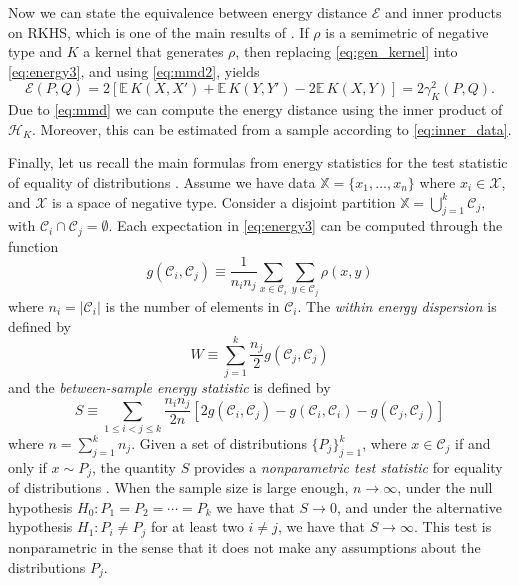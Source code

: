 \documentclass[aps,preprint,nofootinbib,floatfix]{revtex4-1}
\newcommand\Energy{\mathcal{E}}
\newcommand\E{\mathbb{E}}
\newcommand\kk{K}
\newcommand\Hk{{\mathcal{H}}_{\kk}}
\newcommand\C{{\mathcal{C}}}
\begin{document}
Now we can state the equivalence between energy distance $\Energy$ and
inner products on RKHS, which is one of the main results of
\cite{Sejdinovic2013}. If $\rho$ is a semimetric
of negative type and $\kk$ a kernel that generates $\rho$, then
replacing \eqref{eq:gen_kernel} into
\eqref{eq:energy3}, and using \eqref{eq:mmd2}, yields
\begin{equation} \label{eq:Erho}
\Energy(P, Q) = 
2 \left[ \E \, \kk(X, X') + \E \, \kk(Y, Y') - 2\E \, \kk(X, Y)\right] 
= 2 \gamma_\kk^2(P,Q) .
\end{equation}
Due to \eqref{eq:mmd} we can compute the energy distance using the inner 
product of $\Hk$. Moreover, this can be estimated from a sample
according to \eqref{eq:inner_data}.

Finally, let us recall the main formulas from energy statistics
for the test statistic of equality of distributions \cite{Szkely2013}. 
Assume we have data $\mathbb{X} = \{ x_1,\dotsc, x_n \}$ where
$x_i \in \mathcal{X}$, and $\mathcal{X}$ is a space of negative type.
Consider a disjoint partition $\mathbb{X} = \bigcup_{j=1}^k \C_j$, with
$\C_i \cap \C_j = \emptyset$.
Each expectation in 
\eqref{eq:energy3}
can be computed 
through the function
\begin{equation}
\label{eq:g_def}
g (\C_i, \C_j) \equiv 
\dfrac{1}{n_i n_j}
\sum_{x \in \C_i} 
\sum_{y \in \C_j} \rho(x, y)
\end{equation}
where $n_i = |\C_i|$ is the number of elements in 
$\C_i$. 
The \emph{within energy dispersion} is defined by
\begin{equation}
\label{eq:within}
W \equiv
\sum_{j=1}^{k} \dfrac{n_j}{2} g(\C_j, \C_j)
\end{equation}
and the \emph{between-sample energy statistic} is defined by
\begin{equation}
\label{eq:between}
S \equiv
\sum_{1 \le  i < j \le k } \dfrac{n_i n_{j}}{2 n} \left[
2 g(\C_i, \C_j) - 
g(\C_i, \C_i) - 
g(\C_j, \C_j)
\right]
\end{equation}
where $n = \sum_{j=1}^k n_j$.
Given a set of distributions
$\{ P_j\}_{j=1}^k$, where $x \in \C_j$ if and only if $x \sim P_j$, 
the quantity $S$ provides
a \emph{nonparametric test statistic} for equality of distributions
\cite{Szkely2013}.
When the sample size is large enough, $n\to \infty$,
under the null hypothesis $H_0: P_1=P_2=\dotsm=P_k$ we have that
$S\to 0$, 
and under
the alternative hypothesis $H_1: P_i \ne P_j$ for at least two $i\ne j$, 
we have that $S \to \infty$.
This test is nonparametric in the sense that it does not make any assumptions
about the distributions $P_j$.
\end{document}
